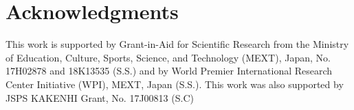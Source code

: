 \documentclass[12pt]{article}
\newcommand{\1}{\mbox{1}\hspace{-0.25em}\mbox{l}}
\begin{document}
\section*{Acknowledgments}
This work is supported by Grant-in-Aid for Scientific Research from the
Ministry of Education, Culture, Sports, Science, and Technology (MEXT),
Japan, No. 17H02878 and 18K13535 (S.S.) and by World Premier
International Research Center Initiative (WPI), MEXT, Japan (S.S.).
This work was also supported by JSPS KAKENHI Grant, No. 17J00813 (S.C)






\end{document}
